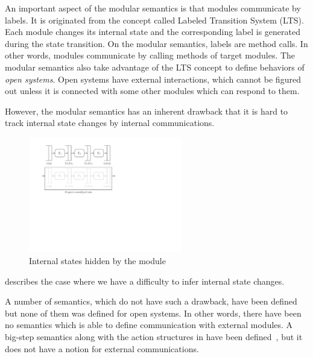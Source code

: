An important aspect of the modular semantics is that modules
communicate by labels. It is originated from the concept called
Labeled Transition System (LTS). Each module changes its internal
state and the corresponding label is generated during the state
transition. On the modular semantics, labels are method calls. In
other words, modules communicate by calling methods of target modules.
The modular semantics also take advantage of the LTS concept to define
behaviors of \emph{open systems}. Open systems have external
interactions, which cannot be figured out unless it is connected with
some other modules which can respond to them.

However, the modular semantics has an inherent drawback that it is hard
to track internal state changes by internal communications.
\begin{figure}[h]
  \centering
  \includegraphics[width=0.6\textwidth]{figures/pipeline-internal.pdf}
  \caption{Internal states hidden by the module}
  \label{ex-modular-semantics-disadvantage}
\end{figure}
 describes the case where we
have a difficulty to infer internal state changes. 

A number of semantics, which do not have such a drawback, have been
defined but none of them was defined for open systems. In other words,
there have been no semantics which is able to define communication
with external modules. A big-step semantics along with the action
structures in \Bluespec{} have been defined~\cite{nirav-memocode}, but
it does not have a notion for external communications.

